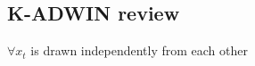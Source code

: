 \subsection{K-ADWIN review}
\begin{assumption}
 $\forall x_{t}$ is drawn independently from each other

\end{assumption}
